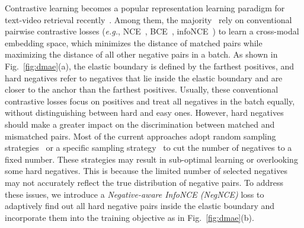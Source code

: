 \documentclass[sigconf]{acmart}
\begin{document}
Contrastive learning becomes a popular representation learning paradigm for text-video retrieval recently~\cite{taco2021,univl2020,frozen2021,Li2021AlignAP,clip4clip2021,videoclip2022,xpool2022,xclip2022,ts2net2022}. 
Among them, the majority~\cite{videobert2019,univl2020,MMT,hanet2021,clip4clip2021,xpool2022,xclip2022,ts2net2022} rely on conventional pairwise contrastive losses (\textit{e.g.}, NCE~\cite{nce2010}, BCE~\cite{hanet2021}, infoNCE~\cite{infonce2018}) to learn a cross-modal embedding space, which minimizes the distance of matched pairs while maximizing the distance of all other negative pairs in a batch.
As shown in Fig.~\ref{fig:dmae}(a), the elastic boundary is defined by the farthest positives, and hard negatives refer to negatives that lie inside the elastic boundary and are closer to the anchor than the farthest positives. 
Usually, these conventional contrastive losses focus on positives and treat all negatives in the batch equally, without distinguishing between hard and easy ones.
However, hard negatives should make a greater impact on the discrimination between matched and mismatched pairs. 
Most of the current approaches adopt random sampling strategies~\cite{actbert2020,univl2020} or a specific sampling strategy~\cite{taco2021,hanet2021,acp2022} to cut the number of negatives to a fixed number. 
These strategies may result in sub-optimal learning or overlooking some hard negatives. This is because the limited number of selected negatives may not accurately reflect the true distribution of negative pairs.
To address these issues, we introduce a \textit{Negative-aware InfoNCE (NegNCE)} loss to adaptively find out all hard negative pairs inside the elastic boundary and incorporate them into the training objective as in Fig.~\ref{fig:dmae}(b). 
\end{document}
